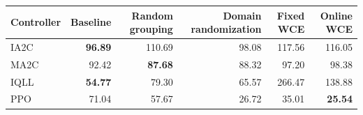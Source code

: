 \begin{tabular}{lrrrrr}
\hline
Controller & Baseline & Random grouping & Domain randomization & Fixed WCE & Online WCE \\
\hline
IA2C & \textbf{96.89} & 110.69 & 98.08 & 117.56 & 116.05 \\
MA2C & 92.42 & \textbf{87.68} & 88.32 & 97.20 & 98.38 \\
IQLL & \textbf{54.77} & 79.30 & 65.57 & 266.47 & 138.88 \\
PPO & 71.04 & 57.67 & 26.72 & 35.01 & \textbf{25.54} \\
\hline
\end{tabular}
